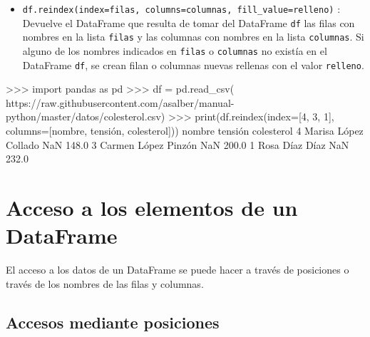 \documentclass[
  spanish,
  a4paper,
]{scrreport}
\newenvironment{Shaded}{\begin{snugshade}}{\end{snugshade}}
\newcommand{\BuiltInTok}[1]{\textcolor[rgb]{0.00,0.23,0.31}{#1}}
\newcommand{\DecValTok}[1]{\textcolor[rgb]{0.68,0.00,0.00}{#1}}
\newcommand{\FloatTok}[1]{\textcolor[rgb]{0.68,0.00,0.00}{#1}}
\newcommand{\ImportTok}[1]{\textcolor[rgb]{0.00,0.46,0.62}{#1}}
\newcommand{\NormalTok}[1]{\textcolor[rgb]{0.00,0.23,0.31}{#1}}
\newcommand{\OperatorTok}[1]{\textcolor[rgb]{0.37,0.37,0.37}{#1}}
\newcommand{\StringTok}[1]{\textcolor[rgb]{0.13,0.47,0.30}{#1}}
\providecommand{\tightlist}{%
  \setlength{\itemsep}{0pt}\setlength{\parskip}{0pt}}
\begin{document}
\begin{itemize}
\tightlist
\item
  \texttt{df.reindex(index=filas,\ columns=columnas,\ fill\_value=relleno)}
  : Devuelve el DataFrame que resulta de tomar del DataFrame \texttt{df}
  las filas con nombres en la lista \texttt{filas} y las columnas con
  nombres en la lista \texttt{columnas}. Si alguno de los nombres
  indicados en \texttt{filas} o \texttt{columnas} no existía en el
  DataFrame \texttt{df}, se crean filan o columnas nuevas rellenas con
  el valor \texttt{relleno}.
\end{itemize}

\begin{Shaded}
\begin{Highlighting}[]
\OperatorTok{\textgreater{}\textgreater{}\textgreater{}} \ImportTok{import}\NormalTok{ pandas }\ImportTok{as}\NormalTok{ pd}
\OperatorTok{\textgreater{}\textgreater{}\textgreater{}}\NormalTok{ df }\OperatorTok{=}\NormalTok{ pd.read\_csv(}
\StringTok{\textquotesingle{}https://raw.githubusercontent.com/asalber/manual{-}python/master/datos/colesterol.csv\textquotesingle{}}\NormalTok{)}
\OperatorTok{\textgreater{}\textgreater{}\textgreater{}} \BuiltInTok{print}\NormalTok{(df.reindex(index}\OperatorTok{=}\NormalTok{[}\DecValTok{4}\NormalTok{, }\DecValTok{3}\NormalTok{, }\DecValTok{1}\NormalTok{], columns}\OperatorTok{=}\NormalTok{[}\StringTok{\textquotesingle{}nombre\textquotesingle{}}\NormalTok{, }\StringTok{\textquotesingle{}tensión\textquotesingle{}}\NormalTok{, }\StringTok{\textquotesingle{}colesterol\textquotesingle{}}\NormalTok{]))}
\NormalTok{                  nombre  tensión  colesterol}
\DecValTok{4}\NormalTok{   Marisa López Collado      NaN       }\FloatTok{148.0}
\DecValTok{3}\NormalTok{    Carmen López Pinzón      NaN       }\FloatTok{200.0}
\DecValTok{1}\NormalTok{         Rosa Díaz Díaz      NaN       }\FloatTok{232.0}
\end{Highlighting}
\end{Shaded}

\section{Acceso a los elementos de un
DataFrame}\label{acceso-a-los-elementos-de-un-dataframe}

El acceso a los datos de un DataFrame se puede hacer a través de
posiciones o través de los nombres de las filas y columnas.

\subsection{Accesos mediante
posiciones}\label{accesos-mediante-posiciones}
\end{document}
